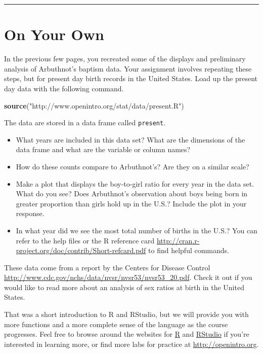 \documentclass[]{book}
\newenvironment{Shaded}{\begin{snugshade}}{\end{snugshade}}
\newcommand{\KeywordTok}[1]{\textcolor[rgb]{0.13,0.29,0.53}{\textbf{#1}}}
\newcommand{\StringTok}[1]{\textcolor[rgb]{0.31,0.60,0.02}{#1}}
\newcommand{\NormalTok}[1]{#1}
\theoremstyle{definition}
\theoremstyle{definition}
\theoremstyle{definition}
\theoremstyle{remark}
\begin{document}
\begin{center}\rule{0.5\linewidth}{\linethickness}\end{center}

\section{On Your Own}\label{on-your-own}

In the previous few pages, you recreated some of the displays and
preliminary analysis of Arbuthnot's baptism data. Your assignment
involves repeating these steps, but for present day birth records in the
United States. Load up the present day data with the following command.

\begin{Shaded}
\begin{Highlighting}[]
\KeywordTok{source}\NormalTok{(}\StringTok{"http://www.openintro.org/stat/data/present.R"}\NormalTok{)}
\end{Highlighting}
\end{Shaded}

The data are stored in a data frame called \texttt{present}.

\begin{itemize}
\item
  What years are included in this data set? What are the dimensions of
  the data frame and what are the variable or column names?
\item
  How do these counts compare to Arbuthnot's? Are they on a similar
  scale?
\item
  Make a plot that displays the boy-to-girl ratio for every year in the
  data set. What do you see? Does Arbuthnot's observation about boys
  being born in greater proportion than girls hold up in the U.S.?
  Include the plot in your response.
\item
  In what year did we see the most total number of births in the U.S.?
  You can refer to the help files or the R reference card
  \url{http://cran.r-project.org/doc/contrib/Short-refcard.pdf} to find
  helpful commands.
\end{itemize}

These data come from a report by the Centers for Disease Control
\url{http://www.cdc.gov/nchs/data/nvsr/nvsr53/nvsr53_20.pdf}. Check it
out if you would like to read more about an analysis of sex ratios at
birth in the United States.

That was a short introduction to R and RStudio, but we will provide you
with more functions and a more complete sense of the language as the
course progresses. Feel free to browse around the websites for
\href{http://www.r-project.org}{R} and
\href{http://rstudio.org}{RStudio} if you're interested in learning
more, or find more labs for practice at \url{http://openintro.org}.
\end{document}
